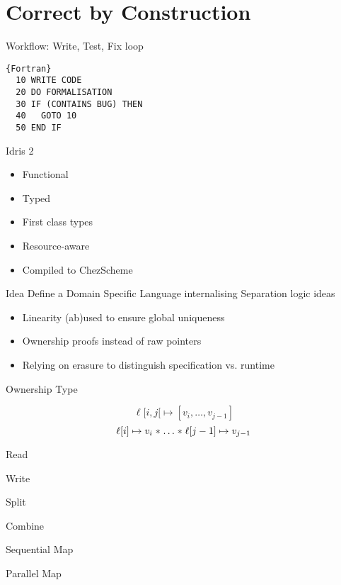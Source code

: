 \section{Correct by Construction}

\begin{frame}[fragile]{Workflow: Write, Test, Fix loop}

\begin{lstlisting}{Fortran}
  10 WRITE CODE
  20 DO FORMALISATION
  30 IF (CONTAINS BUG) THEN
  40   GOTO 10
  50 END IF
\end{lstlisting}

\end{frame}

\begin{frame}{Idris 2}
  \begin{itemize}
    \item Functional
    \item Typed
    \item First class types
    \item Resource-aware
    \item Compiled to ChezScheme
  \end{itemize}
\end{frame}


\begin{frame}{Idea}
  Define a Domain Specific Language internalising
  Separation logic ideas

  \begin{itemize}
    \item Linearity (ab)used to ensure global uniqueness
    \item Ownership proofs instead of raw pointers
    \item Relying on erasure to distinguish specification vs. runtime
  \end{itemize}

\end{frame}

\begin{frame}{Ownership Type}

  $$\ell[i,j[ \mapsto [v_i,\dots,v_{j-1}]$$
  $$\ell[i] \mapsto v_i \mathrel{*} \dots \mathrel{*} \ell[j-1] \mapsto v_{j-1}$$

\end{frame}


\begin{frame}{Read}
\end{frame}

\begin{frame}{Write}
\end{frame}

\begin{frame}{Split}
\end{frame}

\begin{frame}{Combine}
\end{frame}


\begin{frame}{Sequential Map}
\end{frame}


\begin{frame}{Parallel Map}
\end{frame}
